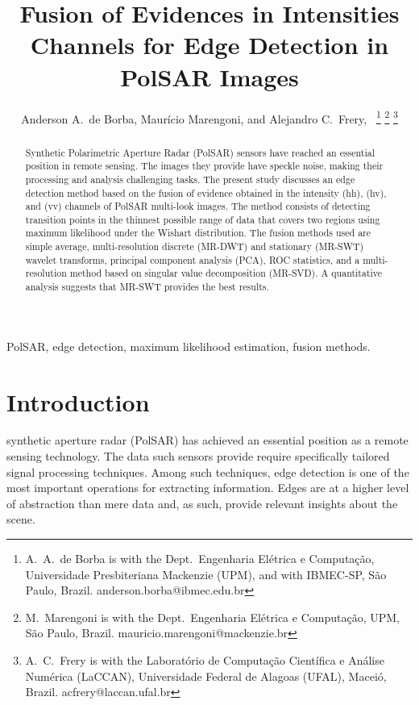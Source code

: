 \documentclass[journal]{IEEEtran}
\begin{document}
\title{Fusion of Evidences in Intensities Channels for Edge Detection in PolSAR Images}
\author{Anderson A.\ de Borba, Maurício Marengoni, and Alejandro C.\ Frery,~%
\thanks{A.\ A.\ de Borba is with the Dept.\ Engenharia Elétrica e Computação, Universidade Presbiteriana Mackenzie (UPM), and with IBMEC-SP, São Paulo, Brazil. anderson.borba@ibmec.edu.br}
\thanks{M.\ Marengoni is with the Dept.\ Engenharia Elétrica e Computação,
UPM, São Paulo, Brazil. mauricio.marengoni@mackenzie.br}
\thanks{A.\ C.\ Frery is with the Laboratório de Computação Científica e Análise Numérica (LaCCAN), Universidade Federal de Alagoas (UFAL), Maceió, Brazil. acfrery@laccan.ufal.br}}

\maketitle

\begin{abstract}
Synthetic Polarimetric Aperture Radar (PolSAR) sensors have reached an essential position in remote sensing. 
The images they provide have speckle noise, making their processing and analysis challenging tasks. 
The present study discusses an edge detection method based on the fusion of evidence obtained in the intensity (hh), (hv), and (vv) channels of PolSAR multi-look images. 
The method consists of detecting transition points in the thinnest possible range of data that covers two regions using maximum likelihood under the Wishart distribution. 
The fusion methods used are 
simple average, 
multi-resolution discrete (MR-DWT) and 
stationary (MR-SWT) wavelet transforms, 
principal component analysis (PCA), 
ROC statistics, 
and a multi-resolution method based on singular value decomposition (MR-SVD). 
A quantitative analysis suggests that MR-SWT provides the best results.
\end{abstract}

\begin{IEEEkeywords}
PolSAR, edge detection, maximum likelihood estimation, fusion methods. 
\end{IEEEkeywords}

\section{Introduction}\label{sec_01}
 synthetic aperture radar (PolSAR) has achieved an essential position as a remote sensing technology. 
The data such sensors provide require specifically tailored signal processing techniques.
Among such techniques, edge detection is one of the most important operations for extracting information.
Edges are at a higher level of abstraction than mere data and, as such, provide relevant insights about the scene.
\end{document}
